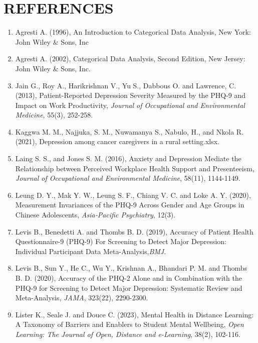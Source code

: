 \documentclass[12pt]{article}\usepackage[]{graphicx}\usepackage[]{xcolor}
\numberwithin{equation}{section}
\numberwithin{figure}{section}
\begin{document}
\section*{REFERENCES}
\begin{enumerate}
	\item  Agresti A. (1996),  An Introduction to Categorical Data Analysis, New York: John Wiley \& Sons, Inc
	\item  Agresti A. (2002), Categorical Data Analysis, Second Edition, New Jersey: John Wiley \& Sons, Inc.
	\item Jain G., Roy A., Harikrishnan V., Yu S., Dabbous O. and Lawrence, C. (2013), Patient-Reported Depression Severity Measured by the PHQ-9 and Impact on Work Productivity, \emph{Journal of Occupational and Environmental Medicine}, 55(3), 252-258.
	\item Kaggwa M. M., Najjuka, S. M., Nuwamanya S., Nabulo, H., and Nkola R. (2021), Depression among cancer caregivers in a rural setting.xlsx.

	
	\item Laing S. S., and Jones S. M. (2016), Anxiety and Depression Mediate the Relationship between Perceived Workplace Health Support and Presenteeism, \emph{Journal of Occupational and Environmental Medicine}, 58(11), 1144-1149.
	
	\item Leung D. Y., Mak Y. W., Leung S. F., Chiang V. C. and Loke A. Y. (2020), Measurement Invariances of the PHQ‐9 Across Gender and Age Groups in Chinese Adolescents,\emph{ Asia‐Pacific Psychiatry}, 12(3).
	
	\item Levis B., Benedetti A. and Thombs B. D. (2019), Accuracy of Patient Health Questionnaire-9 (PHQ-9) For Screening to Detect Major Depression: Individual Participant Data Meta-Analysis,\emph{BMJ}.
	
	\item Levis B., Sun Y., He C., Wu Y., Krishnan A., Bhandari P. M. and Thombs B. D. (2020), Accuracy of the PHQ-2 Alone and in Combination with the PHQ-9 for Screening to Detect Major Depression: Systematic Review and Meta-Analysis,\emph{ JAMA}, 323(22), 2290-2300.
	
	\item Lister K., Seale J. and Douce C. (2023), Mental Health in Distance Learning: A Taxonomy of Barriers and Enablers to Student Mental Wellbeing, \emph{Open Learning: The Journal of Open, Distance and e-Learning}, 38(2), 102-116.
	

\end{enumerate}
\end{document}
